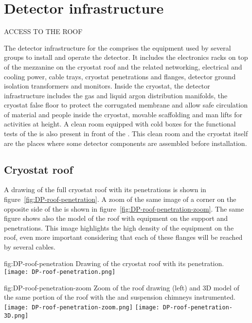 \section{Detector infrastructure}
\label{ch:dp-tc-infrastructure}

ACCESS TO THE ROOF

The detector infrastructure for the  comprises the equipment used by several groups to install and operate the detector.
It includes the electronics racks on top of the mezzanine on the cryostat roof and the related networking, electrical and cooling power, cable trays, cryostat penetrations and flanges, detector ground isolation transformers and monitors.
Inside the cryostat, the detector infrastructure includes the gas and liquid argon distribution manifolds, the cryostat false floor to protect the corrugated membrane and allow safe circulation of material and people inside the cryostat, movable scaffolding and man lifts for activities at height.
A clean room equipped with cold boxes for the functional tests of the  is also present in front of the .
This clean room and the cryostat itself are the places where some detector components are assembled before installation.

\subsection{Cryostat roof}
A drawing of the full cryostat roof with its penetrations is shown in figure~\ref{fig:DP-roof-penetration}.
A zoom of the same image of a corner on the opposite side of the  is shown in figure~\ref{fig:DP-roof-penetration-zoom}.
The same figure shows also the \threed model of the roof with equipment on the  support and  penetrations. 
This image highlights the high density of the equipment on the  roof, even more important considering that each of these flanges will be reached by several cables.

\begin{dunefigure}{fig:DP-roof-penetration}
{Drawing of the cryostat roof with its penetration.}
\texttt{[image: DP-roof-penetration.png]}
\end{dunefigure}

\begin{dunefigure}{fig:DP-roof-penetration-zoom}
{Zoom of the  roof drawing (left) and 3D model of the same portion of the roof with the  and  suspension chimneys instrumented.}
\texttt{[image: DP-roof-penetration-zoom.png]}
\texttt{[image: DP-roof-penetration-3D.png]}
\end{dunefigure}

